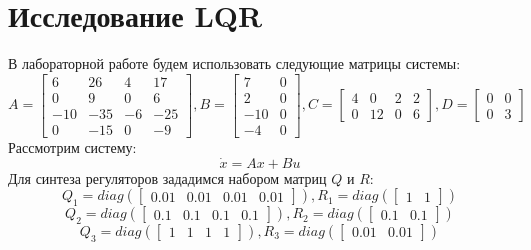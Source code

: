 \section{Исследование LQR}
В лабораторной работе будем использовать следующие матрицы системы:
\begin{equation*}
    A = \begin{bmatrix}
        6 & 26 & 4 & 17 \\
        0 & 9 & 0 & 6 \\
        -10 & -35 & -6 & -25 \\
        0 & -15 & 0 & -9
    \end{bmatrix},
    B = \begin{bmatrix}
        7 & 0 \\
        2 & 0 \\
        -10 & 0 \\
        -4 & 0
    \end{bmatrix},
    C = \begin{bmatrix}
        4 & 0 & 2 & 2 \\
        0 & 12 & 0 & 6
    \end{bmatrix},
    D = \begin{bmatrix}
        0 & 0 \\
        0 & 3
    \end{bmatrix}
\end{equation*}
Рассмотрим систему:
\begin{equation}
    \dot{x} = Ax + Bu
\end{equation}
Для синтеза регуляторов зададимся набором матриц $Q$ и $R$:
\begin{equation*}
    Q_1 = diag(\begin{bmatrix}
        0.01 & 0.01 & 0.01 & 0.01
    \end{bmatrix}), R_1 = diag(\begin{bmatrix}
        1 & 1
    \end{bmatrix})
\end{equation*}
\begin{equation*}
    Q_2 = diag(\begin{bmatrix}
        0.1 & 0.1 & 0.1 & 0.1
    \end{bmatrix}), R_2 = diag(\begin{bmatrix}
        0.1 & 0.1
    \end{bmatrix})
\end{equation*}
\begin{equation*}
    Q_3 = diag(\begin{bmatrix}
        1 & 1 & 1 & 1
    \end{bmatrix}), R_3 = diag(\begin{bmatrix}
        0.01 & 0.01
    \end{bmatrix})
\end{equation*}
